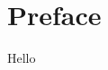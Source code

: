 \documentclass[main]{subfiles}
\begin{document}
\chapter{Preface}\label{ch:preface}

Hello
\end{document}
